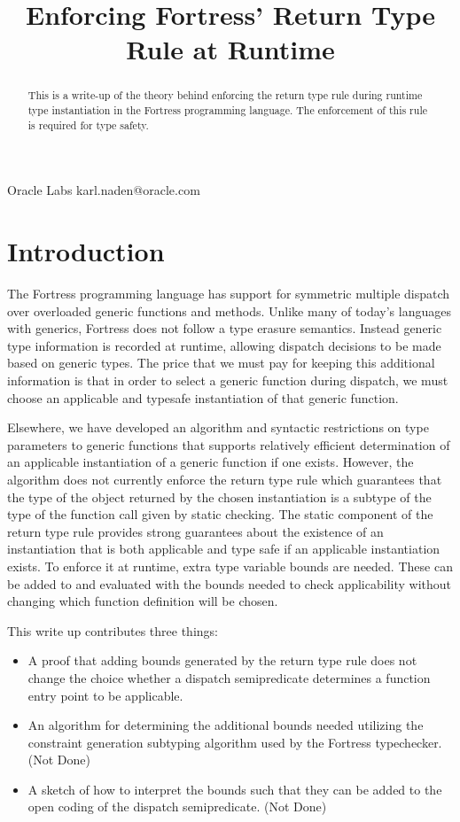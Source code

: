 \documentclass[preprint]{sigplanconf}
\begin{document}
\title{Enforcing Fortress' Return Type Rule at Runtime}

           {Oracle Labs}
           {karl.naden@oracle.com}

\maketitle

\begin{abstract}
This is a write-up of the theory behind enforcing the return type rule
during runtime type instantiation in the Fortress programming language.
The enforcement of this rule is required for type safety.
\end{abstract}

\section{Introduction}

The Fortress programming language has support for symmetric multiple dispatch
over overloaded generic functions and methods.  Unlike many of today's languages with generics, 
Fortress does not follow a type erasure semantics.  Instead
generic type information is recorded at runtime, allowing dispatch decisions to be made
based on generic types.  The price that we must pay for keeping this additional information
is that in order to select a generic function during dispatch, we must choose an applicable
and typesafe instantiation of that generic function.

Elsewhere, we have developed an algorithm and syntactic restrictions on type parameters
to generic functions that supports relatively efficient determination of an applicable instantiation
of a generic function if one exists.  However, the algorithm does not currently enforce the
return type rule which guarantees that the type of the object returned by the chosen instantiation
is a subtype of the type of the function call given by static checking.  The static component of the
return type rule provides strong guarantees about the existence of an instantiation that is both
applicable and type safe if an applicable instantiation exists.  To enforce it at runtime, extra type
variable bounds are needed.  These can be added to and evaluated with the
bounds needed to check applicability without changing which function definition will be chosen.

This write up contributes three things:
\begin{itemize}
\item A proof that adding bounds generated by the return type rule does not change the choice whether 
	a dispatch semipredicate determines a function entry point to be applicable.
\item An algorithm for determining the additional bounds needed utilizing the constraint generation
	subtyping algorithm used by the Fortress typechecker. (Not Done)
\item A sketch of how to interpret the bounds such that they can be added to the open coding of the 
	dispatch semipredicate. (Not Done)
\end{itemize}
\end{document}
